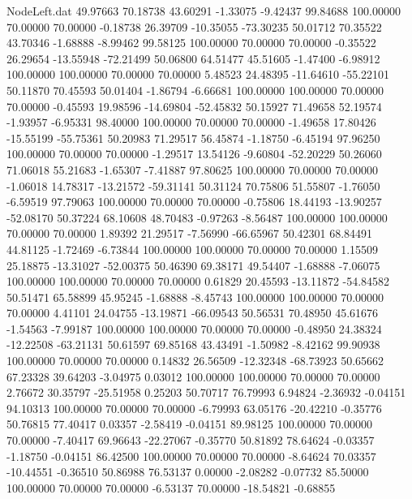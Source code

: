 \begin{filecontents}{NodeLeft.dat}
  49.97663   70.18738   43.60291    -1.33075   -9.42437   99.84688  100.00000   70.00000   70.00000   -0.18738   26.39709  -10.35055  -73.30235
  50.01712   70.35522   43.70346    -1.68888   -8.99462   99.58125  100.00000   70.00000   70.00000   -0.35522   26.29654  -13.55948  -72.21499
  50.06800   64.51477   45.51605    -1.47400   -6.98912  100.00000  100.00000   70.00000   70.00000    5.48523   24.48395  -11.64610  -55.22101
  50.11870   70.45593   50.01404    -1.86794   -6.66681  100.00000  100.00000   70.00000   70.00000   -0.45593   19.98596  -14.69804  -52.45832
  50.15927   71.49658   52.19574    -1.93957   -6.95331   98.40000  100.00000   70.00000   70.00000   -1.49658   17.80426  -15.55199  -55.75361
  50.20983   71.29517   56.45874    -1.18750   -6.45194   97.96250  100.00000   70.00000   70.00000   -1.29517   13.54126   -9.60804  -52.20229
  50.26060   71.06018   55.21683    -1.65307   -7.41887   97.80625  100.00000   70.00000   70.00000   -1.06018   14.78317  -13.21572  -59.31141
  50.31124   70.75806   51.55807    -1.76050   -6.59519   97.79063  100.00000   70.00000   70.00000   -0.75806   18.44193  -13.90257  -52.08170
  50.37224   68.10608   48.70483    -0.97263   -8.56487  100.00000  100.00000   70.00000   70.00000    1.89392   21.29517   -7.56990  -66.65967
  50.42301   68.84491   44.81125    -1.72469   -6.73844  100.00000  100.00000   70.00000   70.00000    1.15509   25.18875  -13.31027  -52.00375
  50.46390   69.38171   49.54407    -1.68888   -7.06075  100.00000  100.00000   70.00000   70.00000    0.61829   20.45593  -13.11872  -54.84582
  50.51471   65.58899   45.95245    -1.68888   -8.45743  100.00000  100.00000   70.00000   70.00000    4.41101   24.04755  -13.19871  -66.09543
  50.56531   70.48950   45.61676    -1.54563   -7.99187  100.00000  100.00000   70.00000   70.00000   -0.48950   24.38324  -12.22508  -63.21131
  50.61597   69.85168   43.43491    -1.50982   -8.42162   99.90938  100.00000   70.00000   70.00000    0.14832   26.56509  -12.32348  -68.73923
  50.65662   67.23328   39.64203    -3.04975    0.03012  100.00000  100.00000   70.00000   70.00000    2.76672   30.35797  -25.51958    0.25203
  50.70717   76.79993    6.94824    -2.36932   -0.04151   94.10313  100.00000   70.00000   70.00000   -6.79993   63.05176  -20.42210   -0.35776
  50.76815   77.40417    0.03357    -2.58419   -0.04151   89.98125  100.00000   70.00000   70.00000   -7.40417   69.96643  -22.27067   -0.35770
  50.81892   78.64624   -0.03357    -1.18750   -0.04151   86.42500  100.00000   70.00000   70.00000   -8.64624   70.03357  -10.44551   -0.36510
  50.86988   76.53137    0.00000    -2.08282   -0.07732   85.50000  100.00000   70.00000   70.00000   -6.53137   70.00000  -18.54821   -0.68855

\end{filecontents}
